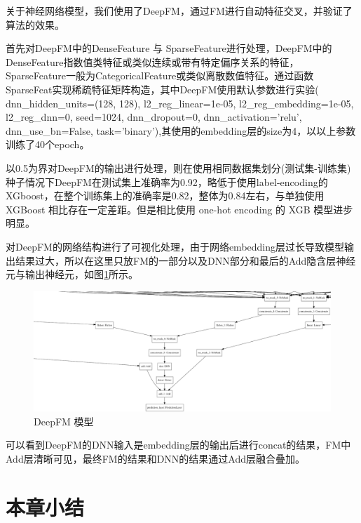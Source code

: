 关于神经网络模型，我们使用了DeepFM，通过FM进行自动特征交叉，并验证了算法的效果。

首先对DeepFM中的DenseFeature 与 SparseFeature进行处理，DeepFM中的DenseFeature指数值类特征或类似连续或带有特定偏序关系的特征，SparseFeature一般为CategoricalFeature或类似离散数值特征。通过函数SparseFeat实现稀疏特征矩阵构造，其中DeepFM使用默认参数进行实验(
dnn\_hidden\_units=(128, 128), l2\_reg\_linear=1e-05, l2\_reg\_embedding=1e-05, l2\_reg\_dnn=0, seed=1024, dnn\_dropout=0, dnn\_activation='relu', dnn\_use\_bn=False, task='binary'),其使用的embedding层的size为4，以以上参数训练了40个epoch。

以0.5为界对DeepFM的输出进行处理，则在使用相同数据集划分(测试集-训练集)种子情况下DeepFM在测试集上准确率为0.92，略低于使用label-encoding的 XGboost，在整个训练集上的准确率是0.82，整体为0.84左右，与单独使用 XGBoost 相比存在一定差距。但是相比使用 one-hot encoding 的 XGB 模型进步明显。

对DeepFM的网络结构进行了可视化处理，由于网络embedding层过长导致模型输出结果过大，所以在这里只放FM的一部分以及DNN部分和最后的Add隐含层神经元与输出神经元，如图\ref{DeepFM-Model}所示。

\begin{figure}[htbp]
  \vspace{13pt} %
  \centering
  \includegraphics[width=0.95\linewidth]{images/DeepFM-Model.png}
  \caption{DeepFM 模型}\label{DeepFM-Model} %
\end{figure}

可以看到DeepFM的DNN输入是embedding层的输出后进行concat的结果，FM中Add层清晰可见，最终FM的结果和DNN的结果通过Add层融合叠加。

\section{本章小结}

